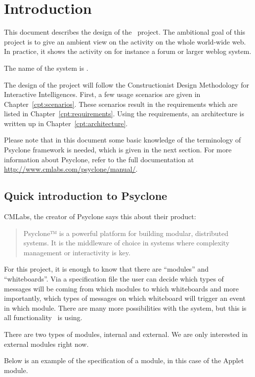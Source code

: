 \chapter{Introduction}

This document describes the design of the \AmbE\ project. The ambitional goal
of this project is to give an ambient view on the activity on the whole
world-wide web. In practice, it shows the activity on for instance a forum or
larger weblog system.

The name of the system is \Amber{}.

The design of the project will follow the Constructionist Design Methodology
for Interactive Intelligences\cite{CDM}. First, a few usage scenarios are given
in Chapter~\ref{cpt:scenarios}. These scenarios result in the requirements
which are listed in Chapter~\ref{cpt:requirements}. Using the requirements, an
architecture is written up in Chapter~\ref{cpt:architecture}.

Please note that in this document some basic knowledge of the terminology of
Psyclone framework is needed, which is given in the next section. For more
information about Psyclone, refer to the full documentation at
\url{http://www.cmlabs.com/psyclone/manual/}.

\section{Quick introduction to Psyclone}

CMLabs, the creator of Psyclone says this about their product:

\begin{quote}
  Psyclone™ is a powerful platform for building modular, distributed systems.
  It is the middleware of choice in systems where complexity management or
  interactivity is key.
\end{quote}

For this project, it is enough to know that there are ``modules'' and
``whiteboards''. Via a specification file the user can decide which types of
messages will be coming from which modules to which whiteboards and more
importantly, which types of messages on which whiteboard will trigger an event
in which module. There are many more possibilities with the system, but this is
all functionality \Amber\ is using.

There are two types of modules, internal and external. We are only interested
in external modules right now.

Below is an example of the specification of a module, in this case of the
Applet module. 

